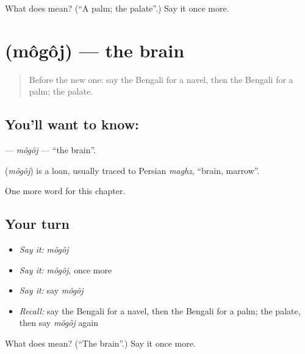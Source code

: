 \begin{tcolorbox}[breakable,colback=teal!4,colframe=teal!35!black,title={Before you move on}]
What does  mean? (\textquotedblleft{}A palm; the palate\textquotedblright{}.) Say it once more.
\end{tcolorbox}
\section[\texorpdfstring{\bn{মগজ} (môgôj)}{মগজ (môgôj)}]{ (môgôj) — the brain}

\label{lesson:BN-C186-mogoj}



\begin{quote}
Before the new one: say the Bengali for a navel, then the Bengali for a palm; the palate.
\end{quote}

\subsection*{You'll want to know: }
\textbf{} — \emph{môgôj} — \textquotedblleft{}the brain\textquotedblright{}.

\begin{cousinweb}
\textbf{} (\emph{môgôj}) is a loan, usually traced to Persian \emph{maghz}, \textquotedblleft{}brain, marrow\textquotedblright{}.
\end{cousinweb}

\begin{grammarlens}[title={What you've built}]
One more word for this chapter.
\end{grammarlens}

\subsection*{Your turn}
\begin{itemize}
\raggedright
  \item \emph{Say it:} \emph{môgôj}
  \item \emph{Say it:} \emph{môgôj}, once more
  \item \emph{Say it:} say \emph{môgôj}
  \item \emph{Recall:} say the Bengali for a navel, then the Bengali for a palm; the palate, then say \emph{môgôj} again
\end{itemize}

\begin{tcolorbox}[breakable,colback=teal!4,colframe=teal!35!black,title={Before you move on}]
What does  mean? (\textquotedblleft{}The brain\textquotedblright{}.) Say it once more.
\end{tcolorbox}
